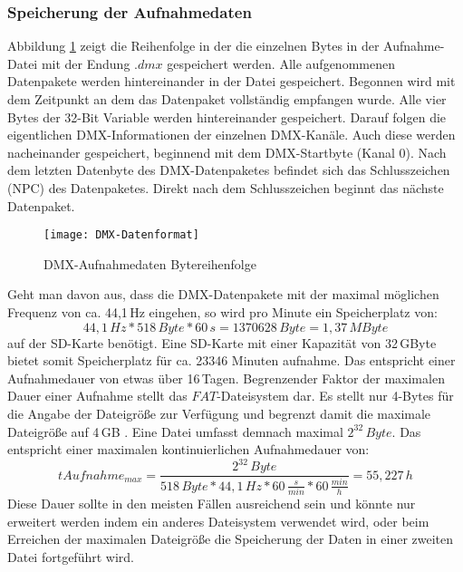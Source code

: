 \subsubsection{Speicherung der Aufnahmedaten}
\label{sec:save_data}
Abbildung \ref{fig:DMXDatenformat} zeigt die Reihenfolge in der die einzelnen Bytes in der Aufnahme-Datei mit der Endung $.dmx$ gespeichert werden. Alle aufgenommenen Datenpakete werden hintereinander in der Datei gespeichert. Begonnen wird mit dem Zeitpunkt an dem das Datenpaket vollständig empfangen wurde. Alle vier Bytes der 32-Bit Variable werden hintereinander gespeichert. Darauf folgen die eigentlichen DMX-Informationen der einzelnen DMX-Kanäle. Auch diese werden nacheinander gespeichert, beginnend mit dem DMX-Startbyte (Kanal 0). Nach dem letzten Datenbyte des DMX-Datenpaketes befindet sich das Schlusszeichen (NPC) des Datenpaketes. Direkt nach dem Schlusszeichen beginnt das nächste Datenpaket. 
\begin{figure}[h]
	\begin{center}
		\texttt{[image: DMX-Datenformat]}
		\caption{DMX-Aufnahmedaten Bytereihenfolge}
		\label{fig:DMXDatenformat}
	\end{center}
\end{figure} Geht man davon aus, dass die DMX-Datenpakete mit der maximal möglichen Frequenz von ca. 44,1\,Hz eingehen, so wird pro Minute ein Speicherplatz von:
\begin{equation}
	44,1\,Hz * 518\,Byte * 60\,s = 1370628\,Byte = 1,37\,MByte
\end{equation} auf der SD-Karte benötigt. Eine SD-Karte mit einer Kapazität von 32\,GByte bietet somit Speicherplatz für ca. 23346 Minuten aufnahme. Das entspricht einer Aufnahmedauer von etwas über 16\,Tagen. Begrenzender Faktor der maximalen Dauer einer Aufnahme stellt das $FAT$-Dateisystem dar. Es stellt nur 4-Bytes für die Angabe der Dateigröße zur Verfügung und begrenzt damit die maximale Dateigröße auf 4\,GB \cite[s. 128]{BetriebssystemeKompakt}. Eine Datei umfasst demnach maximal $2^{32}\,Byte$. Das entspricht einer maximalen kontinuierlichen Aufnahmedauer von:
\begin{equation}
	tAufnahme_{max} = \frac{2^{32}\,Byte}{518\,Byte * 44,1\,Hz * 60\,\frac{s}{min} * 60\,\frac{min}{h}} = 55,227\,h
\end{equation}
Diese Dauer sollte in den meisten Fällen ausreichend sein und könnte nur erweitert werden indem ein anderes Dateisystem verwendet wird, oder beim Erreichen der maximalen Dateigröße die Speicherung der Daten in einer zweiten Datei fortgeführt wird. 

